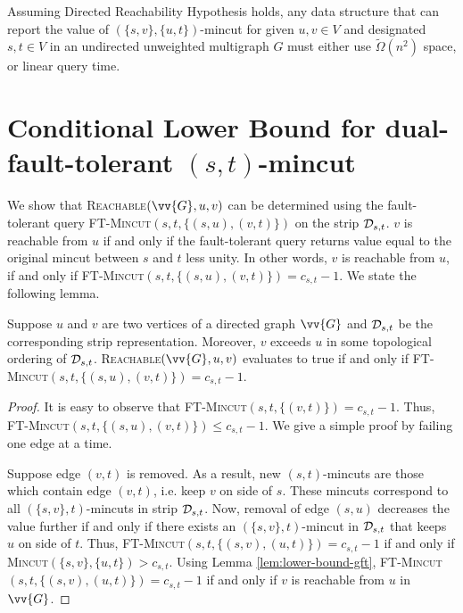 \begin{theorem}
\label{th:lower-bound-gft}
Assuming Directed Reachability Hypothesis holds, any data structure that can report the value of $(\{s,v\},\{u,t\})$-mincut for given $u,v \in V$ and designated $s,t \in V$ in an undirected unweighted multigraph $G$ must either use ${\tilde \Omega}(n^2)$ space, or linear query time.
\end{theorem}



\section{Conditional Lower Bound for dual-fault-tolerant $(s,t)$-mincut}

We show that \textsc{Reachable}$(\vv{G},u,v)$ can be determined using the fault-tolerant query \textsc{FT-Mincut}$(s,t,\{(s,u),(v,t)\})$ on the strip ${\cal D}_{s,t}$. $v$ is reachable from $u$ if and only if the fault-tolerant query returns value equal to the original mincut between $s$ and $t$ less unity. In other words, $v$ is reachable from $u$, if and only if \textsc{FT-Mincut}$(s,t,\{(s,u),(v,t)\}) = c_{s,t} - 1$. We state the following lemma.


\begin{lemma}
\label{lem:lower-bound-dftm}
Suppose $u$ and $v$ are two vertices of a directed graph $\vv{G}$ and ${\cal D}_{s,t}$ be the corresponding strip representation. Moreover, $v$ exceeds $u$ in some topological ordering of ${\cal D}_{s,t}$. \textsc{Reachable}$(\vv{G},u,v)$ evaluates to true if and only if \textsc{FT-Mincut}$(s,t,\{(s,u),(v,t)\}) = c_{s,t} - 1$.
\end{lemma}
\begin{proof}
It is easy to observe that \textsc{FT-Mincut}$(s,t,\{(v,t)\}) = c_{s,t}-1$. Thus, \textsc{FT-Mincut}$(s,t,\{(s,u),(v,t)\}) \leq c_{s,t}-1$. We give a simple proof by failing one edge at a time. 

Suppose edge $(v,t)$ is removed. As a result, new $(s,t)$-mincuts are those which contain edge $(v,t)$, i.e. keep $v$ on side of $s$. These mincuts correspond to all $(\{s,v\},t)$-mincuts in strip ${\cal D}_{s,t}$. Now, removal of edge $(s,u)$ decreases the value further if and only if there exists an $(\{s,v\},t)$-mincut in ${\cal D}_{s,t}$ that keeps $u$ on side of $t$. Thus, \textsc{FT-Mincut}$(s,t,\{(s,v),(u,t)\}) = c_{s,t} - 1$ if and only if \textsc{Mincut}$(\{s,v\},\{u,t\}) > c_{s,t}$. Using Lemma \ref{lem:lower-bound-gft}, \textsc{FT-Mincut}$(s,t,\{(s,v),(u,t)\}) = c_{s,t} - 1$ if and only if $v$ is reachable from $u$ in $\vv{G}$.
\end{proof}

